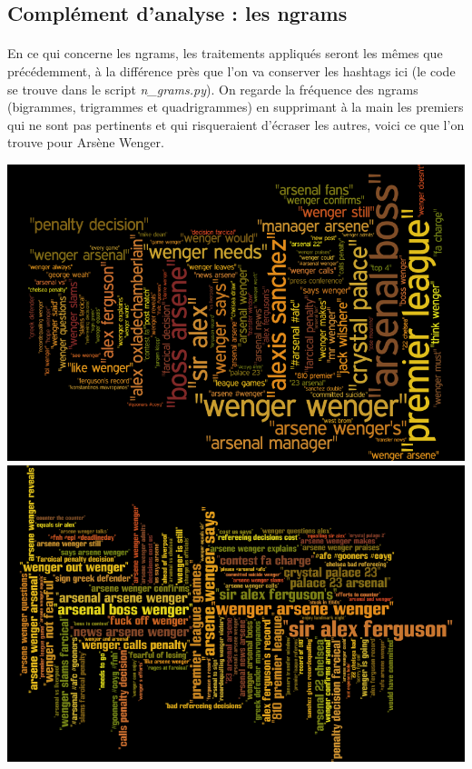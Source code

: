 \documentclass[14pt, openany]{article}
\begin{document}
\subsection{Complément d'analyse : les ngrams}
\paragraph{}
En ce qui concerne les ngrams, les traitements appliqués seront les mêmes que précédemment, à la différence près que l'on va conserver les hashtags ici (le code se trouve dans le script \textit{n\_grams.py}). On regarde la fréquence des ngrams (bigrammes, trigrammes et quadrigrammes) en supprimant à la main les premiers qui ne sont pas pertinents et qui risqueraient d'écraser les autres, voici ce que l'on trouve pour Arsène Wenger.
\begin{center}
\includegraphics[scale=0.6]{Images/wenger_bigram.png}
\includegraphics[scale=0.6]{Images/wenger_trigram.png}

\end{center}
\end{document}
